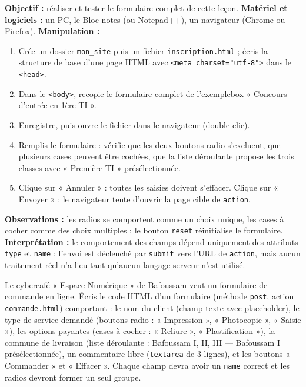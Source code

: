 \documentclass[11pt]{article}
\begin{document}
\begin{experience}
\textbf{Objectif :} réaliser et tester le formulaire complet de cette leçon.
\textbf{Matériel et logiciels :} un PC, le Bloc-notes (ou Notepad++), un navigateur (Chrome ou Firefox).
\textbf{Manipulation :}
\begin{enumerate}
\item Crée un dossier \texttt{mon\_site} puis un fichier \texttt{inscription.html} ; écris la structure de base d'une page HTML avec \texttt{<meta charset="utf-8">} dans le \texttt{<head>}.
\item Dans le \texttt{<body>}, recopie le formulaire complet de l'exemplebox « Concours d'entrée en 1ère TI ».
\item Enregistre, puis ouvre le fichier dans le navigateur (double-clic).
\item Remplis le formulaire : vérifie que les deux boutons radio s'excluent, que plusieurs cases peuvent être cochées, que la liste déroulante propose les trois classes avec « Première TI » présélectionnée.
\item Clique sur « Annuler » : toutes les saisies doivent s'effacer. Clique sur « Envoyer » : le navigateur tente d'ouvrir la page cible de \texttt{action}.
\end{enumerate}
\textbf{Observations :} les radios se comportent comme un choix unique, les cases à cocher comme des choix multiples ; le bouton \texttt{reset} réinitialise le formulaire.
\textbf{Interprétation :} le comportement des champs dépend uniquement des attributs \texttt{type} et \texttt{name} ; l'envoi est déclenché par \texttt{submit} vers l'URL de \texttt{action}, mais aucun traitement réel n'a lieu tant qu'aucun langage serveur n'est utilisé.
\end{experience}

\begin{exercice}
Le cybercafé « Espace Numérique » de Bafoussam veut un formulaire de commande en ligne. Écris le code HTML d'un formulaire (méthode \texttt{post}, action \texttt{commande.html}) comportant : le nom du client (champ texte avec placeholder), le type de service demandé (boutons radio : « Impression », « Photocopie », « Saisie »), les options payantes (cases à cocher : « Reliure », « Plastification »), la commune de livraison (liste déroulante : Bafoussam I, II, III — Bafoussam I présélectionnée), un commentaire libre (\texttt{textarea} de 3 lignes), et les boutons « Commander » et « Effacer ». Chaque champ devra avoir un \texttt{name} correct et les radios devront former un seul groupe.
\end{exercice}
\end{document}
